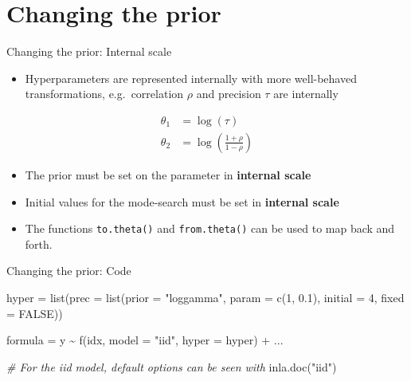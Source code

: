 \documentclass[
  ignorenonframetext,
]{beamer}
\newenvironment{Shaded}{\begin{snugshade}}{\end{snugshade}}
\newcommand{\AttributeTok}[1]{\textcolor[rgb]{0.77,0.63,0.00}{#1}}
\newcommand{\CommentTok}[1]{\textcolor[rgb]{0.56,0.35,0.01}{\textit{#1}}}
\newcommand{\ConstantTok}[1]{\textcolor[rgb]{0.00,0.00,0.00}{#1}}
\newcommand{\DecValTok}[1]{\textcolor[rgb]{0.00,0.00,0.81}{#1}}
\newcommand{\FloatTok}[1]{\textcolor[rgb]{0.00,0.00,0.81}{#1}}
\newcommand{\FunctionTok}[1]{\textcolor[rgb]{0.00,0.00,0.00}{#1}}
\newcommand{\NormalTok}[1]{#1}
\newcommand{\OtherTok}[1]{\textcolor[rgb]{0.56,0.35,0.01}{#1}}
\newcommand{\SpecialCharTok}[1]{\textcolor[rgb]{0.00,0.00,0.00}{#1}}
\newcommand{\StringTok}[1]{\textcolor[rgb]{0.31,0.60,0.02}{#1}}
\providecommand{\tightlist}{%
  \setlength{\itemsep}{0pt}\setlength{\parskip}{0pt}}
\begin{document}
\hypertarget{changing-the-prior}{%
\section{Changing the prior}\label{changing-the-prior}}

\begin{frame}[fragile]{Changing the prior: Internal scale}
\protect\hypertarget{changing-the-prior-internal-scale}{}
\begin{itemize}
\tightlist
\item
  Hyperparameters are represented internally with more well-behaved
  transformations, e.g.~correlation \(\rho\) and precision \(\tau\) are
  internally
\end{itemize}

\[
\begin{aligned}
  \theta_1 &= \log(\tau)\\
    \theta_2 &= \log\left(\frac{1+\rho}{1-\rho}\right)
\end{aligned}
\]

\begin{itemize}
\item
  The prior must be set on the parameter in \textbf{internal scale}
\item
  Initial values for the mode-search must be set in \textbf{internal
  scale}
\item
  The functions \texttt{to.theta()} and \texttt{from.theta()} can be
  used to map back and forth.
\end{itemize}
\end{frame}

\begin{frame}[fragile]{Changing the prior: Code}
\protect\hypertarget{changing-the-prior-code}{}
\begin{Shaded}
\begin{Highlighting}[]
\NormalTok{hyper }\OtherTok{=} \FunctionTok{list}\NormalTok{(}\AttributeTok{prec =} \FunctionTok{list}\NormalTok{(}\AttributeTok{prior =} \StringTok{"loggamma"}\NormalTok{,}
                         \AttributeTok{param =} \FunctionTok{c}\NormalTok{(}\DecValTok{1}\NormalTok{, }\FloatTok{0.1}\NormalTok{),}
                         \AttributeTok{initial =} \DecValTok{4}\NormalTok{,}
                         \AttributeTok{fixed =} \ConstantTok{FALSE}\NormalTok{))}

\NormalTok{formula }\OtherTok{=}\NormalTok{ y }\SpecialCharTok{\textasciitilde{}} \FunctionTok{f}\NormalTok{(idx, }\AttributeTok{model =} \StringTok{"iid"}\NormalTok{, }\AttributeTok{hyper =}\NormalTok{ hyper) }\SpecialCharTok{+}\NormalTok{ ...}
\end{Highlighting}
\end{Shaded}

\begin{Shaded}
\begin{Highlighting}[]
\CommentTok{\# For the iid model, default options can be seen with}
\FunctionTok{inla.doc}\NormalTok{(}\StringTok{"iid"}\NormalTok{)}
\end{Highlighting}
\end{Shaded}

\normalsize
\end{frame}
\end{document}
